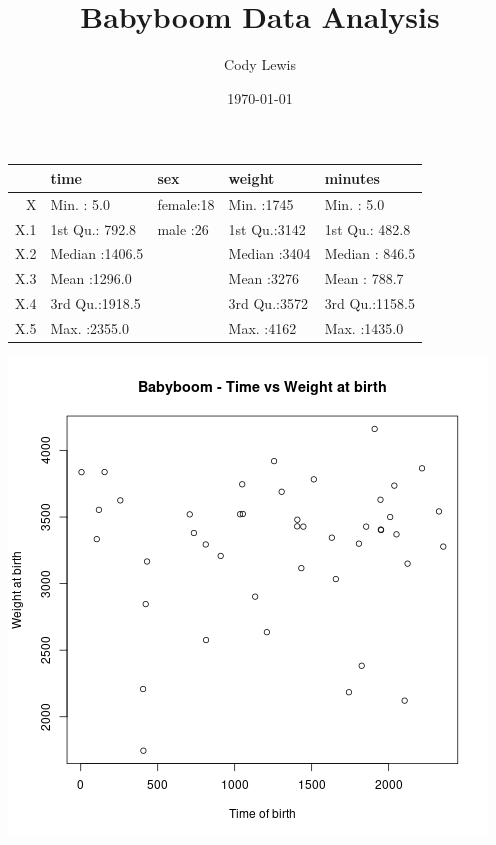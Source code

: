 \documentclass[11pt]{article}
\author{Cody Lewis}
\date{\today}
\title{Babyboom Data Analysis}
\begin{document}
\maketitle
\begin{table}[ht]
\centering
\begin{tabular}{rllll}
  \hline
 &      time &     sex &     weight &    minutes \\
  \hline
X & Min.   :   5.0   & female:18   & Min.   :1745   & Min.   :   5.0   \\
  X.1 & 1st Qu.: 792.8   & male  :26   & 1st Qu.:3142   & 1st Qu.: 482.8   \\
  X.2 & Median :1406.5   &  & Median :3404   & Median : 846.5   \\
  X.3 & Mean   :1296.0   &  & Mean   :3276   & Mean   : 788.7   \\
  X.4 & 3rd Qu.:1918.5   &  & 3rd Qu.:3572   & 3rd Qu.:1158.5   \\
  X.5 & Max.   :2355.0   &  & Max.   :4162   & Max.   :1435.0   \\
   \hline
\end{tabular}
\end{table}

\begin{center}
\includegraphics[width=.9\linewidth]{bb_time_weight.png}
\end{center}
\end{document}
